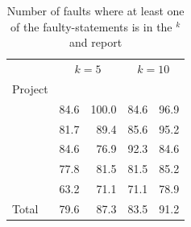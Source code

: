 \documentclass{article}
\begin{document}
%

\begin{table}[h!]
	\small
	\setlength{\tabcolsep}{3pt}
	\centering
	  \begin{tabular}{l|rr|rr}
		 \toprule
       & \multicolumn{2}{c|}{$k=5$} & \multicolumn{2}{c}{$k=10$} \\
		 Project        &   \sfl{}   & \comb &   \sfl{}   & \comb\\
		\midrule
		 \lang{}         &   84.6   & 100.0 & 84.6 & 96.9  \\
		\cmath{}           & 81.7 & 89.4 & 85.6 & 95.2 \\   
		\chart{}           & {\cellcolor{Gray} 84.6} & {\cellcolor{Gray}76.9} & {\cellcolor{Gray}92.3} & {\cellcolor{Gray}84.6}\\
		\jtime{}           & 77.8 & 81.5 & 81.5 & 85.2\\   
		\mockito{}           & 63.2 & 71.1 & 71.1 & 78.9\\   \midrule
		Total         & 79.6 & 87.3 & 83.5 & 91.2\\  
		\bottomrule
	\end{tabular}
  \caption {Number of faults where at least one of the faulty-statements is in the \sfl{}$^{k}$ and  report}
  \label{table:fsws}
\end{table}
\end{document}
